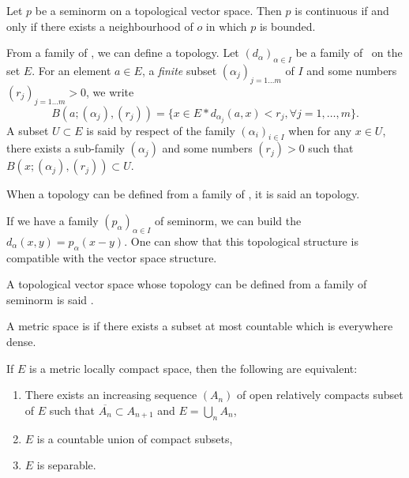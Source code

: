 \begin{proposition}
Let $p$ be a seminorm on a topological vector space. Then $p$ is continuous if and only if there exists a neighbourhood of $o$ in which $p$ is bounded.
\label{prop:semi_norm_cont}
\end{proposition}


From a family of \ecarts, we can define a topology. Let $(d_{\alpha})_{\alpha\in I}$ be a family of \ecarts\ on the set $E$. For an element $a\in E$, a \emph{finite} subset $(\alpha_j)_{j=1\ldots m}$ of $I$ and some numbers $(r_j)_{j=1\ldots m}>0$, we write
\[
  B(a; (\alpha_j),(r_j))=\{x\in E\ast d_{\alpha_j}(a,x)<r_j,\forall j=1,\ldots,m\}.
\]
\label{topo_semi_norm} A subset $U\subset E$ is said  by respect of the family $(\alpha_i)_{i\in I}$ when for any $x\in U$, there exists a sub-family $(\alpha_j)$ and some numbers $(r_j)>0$ such that $B(x;(\alpha_j),(r_j))\subset U$.

\begin{definition}
When a topology can be defined from a family of \ecarts, it is said an  topology.
\end{definition}

If we have a family $(p_{\alpha})_{\alpha\in I}$ of seminorm, we can build the \ecarts\ $d_{\alpha}(x,y)=p_{\alpha}(x-y)$. One can show that this topological structure is compatible with the vector space structure.

\begin{definition}
 A topological vector space whose topology can be defined from a family of seminorm is said .
\end{definition}

\begin{definition}
A metric space is  if there exists a subset at most countable which is everywhere dense.
\end{definition}

\begin{proposition}
If $E$ is a metric locally compact space, then the following are equivalent:
\begin{enumerate}
\item There exists an increasing sequence $(A_n)$ of open relatively compacts subset of $E$ such that $\overline{A_n}\subset A_{n+1}$ and $E=\bigcup_n A_n$,

\item $E$ is a countable union of compact subsets,

\item $E$ is separable.
\end{enumerate}
\end{proposition}

